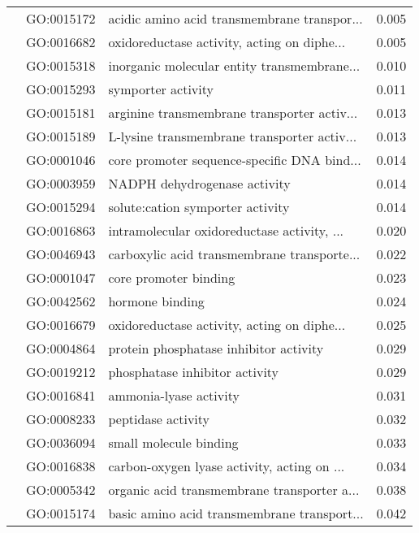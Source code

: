 \begin{longtable}{lllr}
   & GO:0015172 &  acidic amino acid transmembrane transpor... &         0.005 \\
   & GO:0016682 &  oxidoreductase activity, acting on diphe... &         0.005 \\
   & GO:0015318 &  inorganic molecular entity transmembrane... &         0.010 \\
   & GO:0015293 &                           symporter activity &         0.011 \\
   & GO:0015181 &  arginine transmembrane transporter activ... &         0.013 \\
   & GO:0015189 &  L-lysine transmembrane transporter activ... &         0.013 \\
   & GO:0001046 &  core promoter sequence-specific DNA bind... &         0.014 \\
   & GO:0003959 &                 NADPH dehydrogenase activity &         0.014 \\
   & GO:0015294 &             solute:cation symporter activity &         0.014 \\
   & GO:0016863 &  intramolecular oxidoreductase activity, ... &         0.020 \\
   & GO:0046943 &  carboxylic acid transmembrane transporte... &         0.022 \\
   & GO:0001047 &                        core promoter binding &         0.023 \\
   & GO:0042562 &                              hormone binding &         0.024 \\
   & GO:0016679 &  oxidoreductase activity, acting on diphe... &         0.025 \\
   & GO:0004864 &       protein phosphatase inhibitor activity &         0.029 \\
   & GO:0019212 &               phosphatase inhibitor activity &         0.029 \\
   & GO:0016841 &                       ammonia-lyase activity &         0.031 \\
   & GO:0008233 &                           peptidase activity &         0.032 \\
   & GO:0036094 &                       small molecule binding &         0.033 \\
   & GO:0016838 &  carbon-oxygen lyase activity, acting on ... &         0.034 \\
   & GO:0005342 &  organic acid transmembrane transporter a... &         0.038 \\
   & GO:0015174 &  basic amino acid transmembrane transport... &         0.042 \\

\end{longtable}
